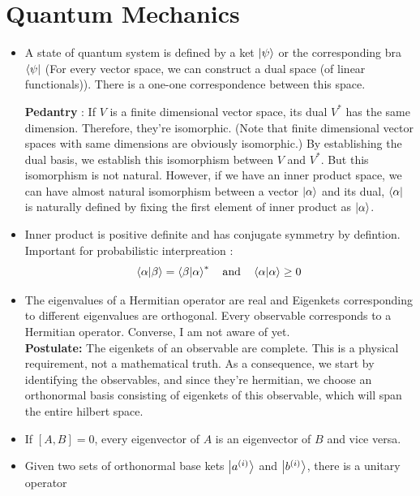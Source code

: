 \documentclass{report}
\begin{document}
\chapter{Quantum Mechanics}

\begin{itemize}

  \item A state of quantum system is defined by a ket $\ket{\psi}$ or the corresponding bra $\bra{\psi}$ (For every vector space, we can construct a dual space (of linear functionals)). There is a one-one correspondence between this space.

  \noindent \textbf {Pedantry} : If $V$ is a finite dimensional vector space, its dual $V^*$ has the same dimension. Therefore, they're isomorphic. (Note that finite dimensional vector spaces with same dimensions are obviously isomorphic.) By establishing the dual basis, we establish this isomorphism between $V$ and $V^*$. But this isomorphism is not natural. However, if we have an inner product space, we can have almost natural isomorphism between a vector $\ket{\alpha}$ and its dual, $\bra{\alpha}$ is naturally defined by fixing the first element of inner product as $\ket{\alpha}$.

  \item Inner product is positive definite and has conjugate symmetry by defintion. Important for probabilistic interpreation :
    $$\bra{\alpha}\ket{\beta} = \bra{\beta}\ket{\alpha}^* \quad \textrm{and} \quad \bra{\alpha}\ket{\alpha} \ge 0$$ 

  \item The eigenvalues of a Hermitian operator are real and Eigenkets corresponding to different eigenvalues are orthogonal. Every observable corresponds to a Hermitian operator. Converse, I am not aware of yet. \\

  \textbf{Postulate:} The eigenkets of an observable are complete. This is a physical requirement, not a mathematical truth. As a consequence, we start by identifying the observables, and since they're hermitian, we choose an orthonormal basis consisting of eigenkets of this observable, which will span the entire hilbert space.

\item If $[A,B] = 0$, every eigenvector of $A$ is an eigenvector of $B$ and vice versa.

\item Given two sets of orthonormal base kets ${\ket{a^{(i)}}}$ and ${\ket{b^{(i)}}}$, there is a unitary operator


\end{itemize}
\end{document}
